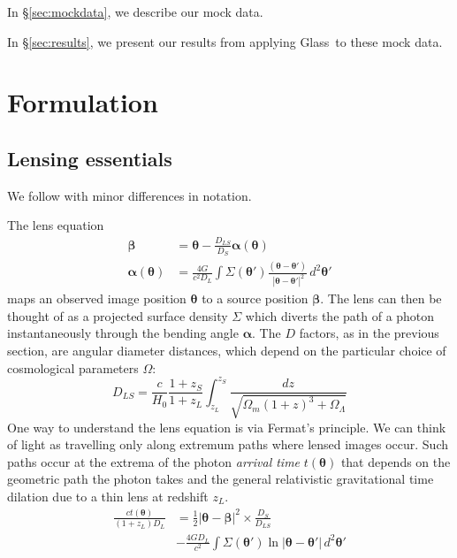 \documentclass[galley,usenatbib]{mn2e}
\newcommand{\Glass}{{\sc Glass}}
\newcommand{\secref}[1] {\S\ref{#1}}
\renewcommand{\vec}[1]{\ensuremath{\boldsymbol{#1}}}
\begin{document}
In \secref{sec:mockdata}, we describe our mock data.

In \secref{sec:results}, we present our results from applying \Glass\ to
these mock data.


\section{Formulation}\label{sec:theory}

\subsection{Lensing essentials}\label{sec:lensing_basic}

We follow \cite{1986ApJ...310..568B} with minor differences in notation.

The lens equation
\begin{equation}
\begin{aligned}
\vec\beta &= \vec\theta - \frac{D_{LS}}{D_S}\vec\alpha(\vec\theta) \\
\vec\alpha(\vec\theta) &= \frac{4G}{c^2D_L} \int \Sigma(\vec\theta')
                          \frac{(\vec\theta - \vec\theta')}
                          {\ |\vec\theta - \vec\theta'|^2} \, d^2\vec\theta'
\end{aligned}
\label{eqn:lens_equation}
\end{equation}
maps an observed image position $\vec\theta$ to a source position
$\vec\beta$.  The lens can then be thought of as a projected surface
density $\Sigma$ which diverts the path of a photon instantaneously
through the bending angle $\vec\alpha$.  The $D$ factors, as in the previous section, are angular
diameter distances, which depend on the particular choice of cosmological
parameters $\Omega$:
\begin{equation}
D_{LS} = \frac c{H_0} \frac{1+z_S}{1+z_L} \int_{z_L}^{z_S}
                      \frac{dz}{\sqrt{\Omega_m(1+z)^3 + \Omega_\Lambda}}
\end{equation}
One way to understand the lens equation is via Fermat's principle. We
can think of light as travelling only along extremum paths where
lensed images occur. Such paths occur at
the extrema of the photon {\it arrival time\/} $t(\vec\theta)$
that depends on the geometric path the photon takes and the general
relativistic gravitational time dilation due to a thin lens at
redshift $z_L$.
\begin{equation}
\begin{aligned}
\frac{ct(\vec\theta)}{(1+z_L)D_{L}}
&= {\textstyle\frac12} |\vec\theta - \vec\beta|^2
   \times \frac{D_{S}}{D_{LS}} \\
&- \frac{4GD_L}{c^2}
   \int \Sigma(\vec\theta') \ln |\vec\theta-\vec\theta'| \, d^2\vec\theta'
\label{full arrival time}
\end{aligned}
\end{equation}
\end{document}
